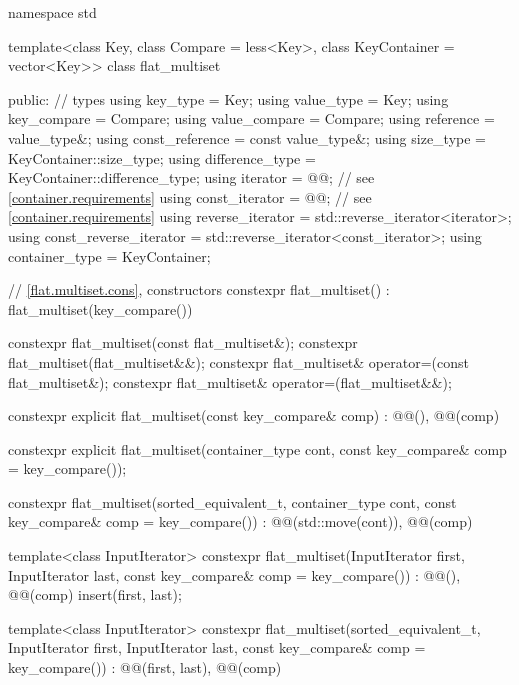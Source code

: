 \begin{codeblock}
namespace std {
  template<class Key, class Compare = less<Key>, class KeyContainer = vector<Key>>
  class flat_multiset {
  public:
    // types
    using key_type               = Key;
    using value_type             = Key;
    using key_compare            = Compare;
    using value_compare          = Compare;
    using reference              = value_type&;
    using const_reference        = const value_type&;
    using size_type              = KeyContainer::size_type;
    using difference_type        = KeyContainer::difference_type;
    using iterator               = @@;     // see \ref{container.requirements}
    using const_iterator         = @@;     // see \ref{container.requirements}
    using reverse_iterator       = std::reverse_iterator<iterator>;
    using const_reverse_iterator = std::reverse_iterator<const_iterator>;
    using container_type         = KeyContainer;

    // \ref{flat.multiset.cons}, constructors
    constexpr flat_multiset() : flat_multiset(key_compare()) { }

    constexpr flat_multiset(const flat_multiset&);
    constexpr flat_multiset(flat_multiset&&);
    constexpr flat_multiset& operator=(const flat_multiset&);
    constexpr flat_multiset& operator=(flat_multiset&&);

    constexpr explicit flat_multiset(const key_compare& comp)
      : @@(), @@(comp) { }

    constexpr explicit flat_multiset(container_type cont,
                                     const key_compare& comp = key_compare());

    constexpr flat_multiset(sorted_equivalent_t, container_type cont,
                            const key_compare& comp = key_compare())
      : @@(std::move(cont)), @@(comp) { }

    template<class InputIterator>
      constexpr flat_multiset(InputIterator first, InputIterator last,
                              const key_compare& comp = key_compare())
        : @@(), @@(comp)
        { insert(first, last); }

    template<class InputIterator>
      constexpr flat_multiset(sorted_equivalent_t, InputIterator first, InputIterator last,
                              const key_compare& comp = key_compare())
        : @@(first, last), @@(comp) { }

}}
\end{codeblock}
